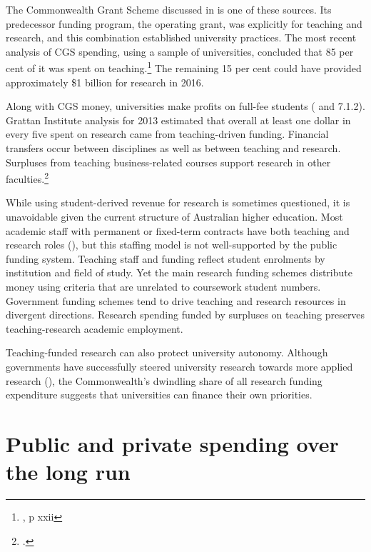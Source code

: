 \documentclass{grattan}
\begin{document}
The Commonwealth Grant Scheme discussed in  is one of these sources. Its predecessor funding program, the operating grant, was explicitly for teaching and research, and this combination established university practices. The most recent analysis of CGS spending, using a sample of universities, concluded that 85 per cent of it was spent on teaching.\footnote{\textcite[][]{DeloitteAccessEconomics2017costofdeliveryof}, p xxii} The remaining 15 per cent could have provided approximately \$1 billion for research in 2016.

Along with CGS money, universities make profits on full-fee students ( and 7.1.2). Grattan Institute analysis for 2013 estimated that overall at least one dollar in every five spent on research came from teaching-driven funding. Financial transfers occur between disciplines as well as between teaching and research. Surpluses from teaching business-related courses support research in other faculties.\footcite[][]{Norton2015thecashnexushow}

While using student-derived revenue for research is sometimes questioned, it is unavoidable given the current structure of Australian higher education. Most academic staff with permanent or fixed-term contracts have both teaching and research roles (), but this staffing model is not well-supported by the public funding system. Teaching staff and funding reflect student enrolments by institution and field of study. Yet the main research funding schemes distribute money using criteria that are unrelated to coursework student numbers. Government funding schemes tend to drive teaching and research resources in divergent directions. Research spending funded by surpluses on teaching preserves teaching-research academic employment.

Teaching-funded research can also protect university autonomy. Although governments have successfully steered university research towards more applied research (), the Commonwealth's dwindling share of all research funding expenditure suggests that universities can finance their own priorities.

%
\section{Public and private spending over the long run}\label{sec:public-and-private-spending-over-the-long-run}
\end{document}
